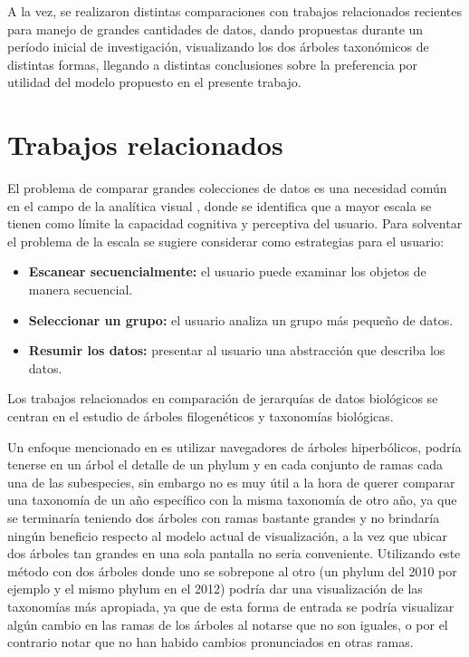 \documentclass[journal]{IEEEtran}
\begin{document}
A la vez, se realizaron distintas comparaciones con trabajos relacionados recientes para manejo de grandes cantidades de datos, dando propuestas durante un período inicial de investigación, visualizando los dos árboles taxonómicos de distintas formas, llegando a distintas conclusiones sobre la preferencia por utilidad del modelo propuesto en el presente trabajo.


   \section{Trabajos relacionados}
El problema de comparar grandes colecciones de datos es una necesidad común en el campo de la analítica visual \cite{gleicher_2018}, donde se identifica
que a mayor escala se tienen como límite la capacidad cognitiva y perceptiva del usuario.  Para solventar el problema de la escala se sugiere considerar como estrategias para el usuario:
\begin{itemize}
  \item \textbf{Escanear secuencialmente:} el usuario puede examinar los objetos de manera secuencial.
  \item \textbf{Seleccionar un grupo:} el usuario analiza un grupo más pequeño de datos.
  \item  \textbf{Resumir los datos:} presentar al usuario una abstracción que describa los datos.
\end{itemize}
Los trabajos relacionados en comparación de jerarquías de datos biológicos se centran en el estudio de árboles filogenéticos y taxonomías
biológicas.

Un enfoque mencionado en \cite{visual-focus} es utilizar navegadores de árboles hiperbólicos, podría tenerse en un árbol el detalle de un phylum y en cada conjunto de ramas cada una de las subespecies, sin embargo no es muy útil a la hora de querer comparar una taxonomía de un año específico con la misma taxonomía de otro año, ya que se terminaría teniendo dos árboles con ramas bastante grandes y no brindaría ningún beneficio respecto al modelo actual de visualización, a la vez que ubicar dos árboles tan grandes en una sola pantalla no seria conveniente. Utilizando este método con dos árboles donde uno se sobrepone al otro (un phylum del 2010 por ejemplo y el mismo phylum en el 2012) podría dar una visualización de las taxonomías más apropiada, ya que de esta forma de entrada se podría visualizar algún cambio en las ramas de los árboles al notarse que no son iguales, o por el contrario notar que no han habido cambios pronunciados en otras ramas.
\end{document}
